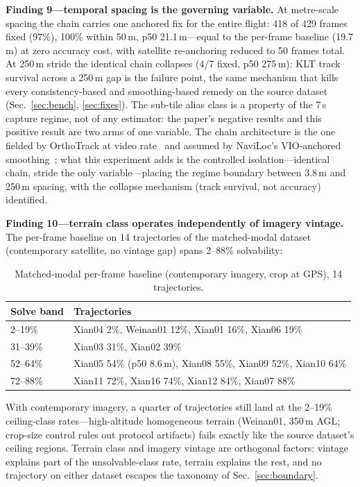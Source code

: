 \documentclass[journal]{IEEEtran}
\begin{document}
\textbf{Finding 9---temporal spacing is the governing variable.} At metre-scale spacing the chain carries one anchored fix for the entire flight: 418 of 429 frames fixed (97\%), 100\% within 50\,m, p50 21.1\,m---equal to the per-frame baseline (19.7\,m) at zero accuracy cost, with satellite re-anchoring reduced to 50 frames total. At 250\,m stride the identical chain collapses (4/7 fixed, p50 275\,m): KLT track survival across a 250\,m gap is the failure point, the same mechanism that kills every consistency-based and smoothing-based remedy on the source dataset (Sec.~\ref{sec:bench}, \ref{sec:fixes}). The sub-tile alias class is a property of the 7\,s capture regime, not of any estimator: the paper's negative results and this positive result are two arms of one variable. The chain architecture is the one fielded by OrthoTrack at video rate~\cite{orthotrack} and assumed by NaviLoc's VIO-anchored smoothing~\cite{naviloc}; what this experiment adds is the controlled isolation---identical chain, stride the only variable---placing the regime boundary between 3.8\,m and 250\,m spacing, with the collapse mechanism (track survival, not accuracy) identified.

\textbf{Finding 10---terrain class operates independently of imagery vintage.} The per-frame baseline on 14 trajectories of the matched-modal dataset (contemporary satellite, no vintage gap) spans 2--88\% solvability:

\begin{table}[t]
\caption{Matched-modal per-frame baseline (contemporary imagery, crop at GPS), 14 trajectories.}
\label{tab:matchedmodal}
\centering
\footnotesize
\setlength{\tabcolsep}{3pt}
\begin{tabular}{@{}l>{\raggedright\arraybackslash}p{2.55in}@{}}
\toprule
Solve band & Trajectories \\
\midrule
2--19\% & Xian04 2\%, Weinan01 12\%, Xian01 16\%, Xian06 19\% \\
31--39\% & Xian03 31\%, Xian02 39\% \\
52--64\% & Xian05 54\% (p50 8.6\,m), Xian08 55\%, Xian09 52\%, Xian10 64\% \\
72--88\% & Xian11 72\%, Xian16 74\%, Xian12 84\%, Xian07 88\% \\
\bottomrule
\end{tabular}
\end{table}

With contemporary imagery, a quarter of trajectories still land at the 2--19\% ceiling-class rates---high-altitude homogeneous terrain (Weinan01, 350\,m AGL; crop-size control rules out protocol artifacts) fails exactly like the source dataset's ceiling regions. Terrain class and imagery vintage are orthogonal factors: vintage explains part of the unsolvable-class rate, terrain explains the rest, and no trajectory on either dataset escapes the taxonomy of Sec.~\ref{sec:boundary}.
\end{document}
